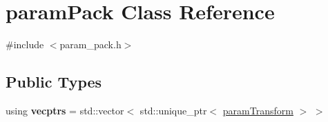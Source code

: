 \hypertarget{classparamPack}{}\section{param\+Pack Class Reference}
\label{classparamPack}


{\ttfamily \#include $<$param\+\_\+pack.\+h$>$}

\subsection*{Public Types}
\begin{DoxyCompactItemize}
\item 
\mbox{\label{classparamPack_a669db12cf2e7908255bf95bc1c46aafe}} 
using {\bfseries vecptrs} = std\+::vector$<$ std\+::unique\+\_\+ptr$<$ \hyperlink{classparamTransform}{param\+Transform} $>$ $>$
\end{DoxyCompactItemize}
